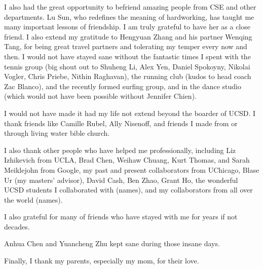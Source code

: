 \documentclass[12pt]{ucsddissertation}
\begin{document}
\begin{acknowledgements}
I also had the great opportunity to befriend amazing people from CSE and other departments. Lu Sun, who redefines the meaning of hardworking, has taught me many important lessons of friendship. I am truly grateful to have her as a close friend. I also extend my gratitude to Hengyuan Zhang and his partner Wenqing Tang, for being great travel partners and tolerating my temper every now and then. I would not have stayed sane without the fantastic times I spent with the tennis group (big shout out to Shuheng Li, Alex Yen, Daniel Spokoyny, Nikolai Vogler, Chris Priebe, Nithin Raghavan), the running club (kudos to head coach Zac Blanco), and the recently formed surfing group, and in the dance studio (which would not have been possible without Jennifer Chien).

I would not have made it had my life not extend beyond the boarder of UCSD. I thank friends like Camille Rubel, Ally Nisenoff, and friends I made from or through living water bible church.

I also thank other people who have helped me professionally, including Liz Izhikevich from UCLA, Brad Chen, Weihaw Chuang, Kurt Thomas, and Sarah Meiklejohn from Google, my past and present collaborators from UChicago, Blase Ur (my masters' advisor), David Cash, Ben Zhao, Grant Ho, the wonderful UCSD students I collaborated with (names), and my collaborators from all over the world (names).


I also grateful for many of friends who have stayed with me for years if not decades.

Anhua Chen and Yuancheng Zhu kept sane during those insane days.

Finally, I thank my parents, especially my mom, for their love.



\end{acknowledgements}
\end{document}
